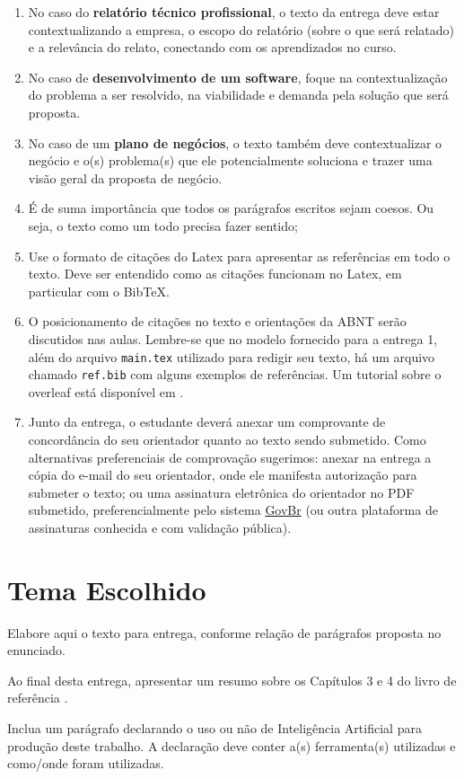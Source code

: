 \documentclass[
	12pt,				%
	openright,			%
	oneside,			%
	a4paper,			%
	chapter=TITLE,		%
	subsection=TITLE,	%
	english,			%
	brazil,				%
	]{abntex2}
\begin{document}
\begin{enumerate}
    \item No caso do \textbf{relatório técnico profissional}, o texto da entrega deve estar contextualizando a empresa, o escopo do relatório (sobre o que será relatado) e a relevância do relato, conectando com os aprendizados no curso.
    \item No caso de \textbf{desenvolvimento de um software}, foque na contextualização do problema a ser resolvido, na viabilidade e demanda pela solução que será proposta.
    \item No caso de um \textbf{plano de negócios}, o texto também deve contextualizar o negócio e o(s) problema(s) que ele potencialmente soluciona e trazer uma visão geral da proposta de negócio.
    \item É de suma importância que todos os parágrafos escritos sejam coesos. Ou seja, o texto como um todo precisa fazer sentido;
    \item Use o formato de citações do Latex para apresentar as referências em todo o texto. Deve ser entendido como as citações funcionam no Latex, em particular com o BibTeX. 
    \item O posicionamento de citações no texto e orientações da ABNT serão discutidos nas aulas. Lembre-se que no modelo fornecido para a entrega 1, além do arquivo \texttt{main.tex} utilizado para redigir seu texto, há um arquivo chamado \texttt{ref.bib} com alguns exemplos de referências. Um tutorial sobre o overleaf está disponível em \cite{TutorialOverleaf}. 
    \item Junto da entrega, o estudante deverá anexar um comprovante de concordância do seu orientador quanto ao texto sendo submetido. Como alternativas preferenciais de comprovação sugerimos: anexar na entrega a cópia do e-mail do seu orientador, onde ele manifesta autorização para submeter o texto; ou uma assinatura eletrônica do orientador no PDF submetido, preferencialmente pelo sistema \href{https://www.gov.br/governodigital/pt-br/identidade/assinatura-eletronica}{GovBr} (ou outra plataforma de assinaturas conhecida e com validação pública).
\end{enumerate}


\chapter{Tema Escolhido}

Elabore aqui o texto para entrega, conforme relação de parágrafos proposta no enunciado.

Ao final desta entrega, apresentar um resumo sobre os Capítulos 3 e 4 do livro de referência \cite{metodologiaWazlawick}.

Inclua um parágrafo declarando o uso ou não de Inteligência Artificial para produção deste trabalho. A declaração deve conter a(s) ferramenta(s) utilizadas e como/onde foram utilizadas.


\end{document}
